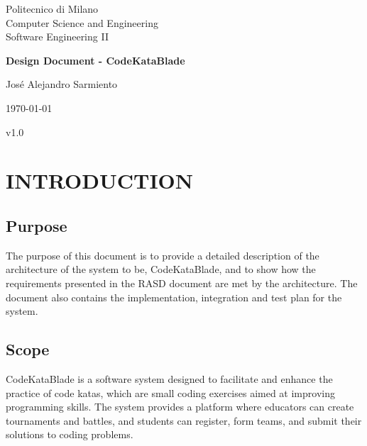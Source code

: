 \documentclass{article}
\begin{document}
\begin{titlepage}
    \begin{center}
        
        Politecnico di Milano\\
      
        Computer Science and Engineering\\
        
        Software Engineering II\\

        \vfill
        
        {\Large \textbf{Design Document - CodeKataBlade}}\\
        
        \vfill

        José Alejandro Sarmiento

        \today

        v1.0
        
    \end{center}
\end{titlepage}
\newpage


\tableofcontents
\newpage

\section{INTRODUCTION}
\subsection{Purpose}

The purpose of this document is to provide a detailed description of the architecture of the system to be, CodeKataBlade, and to show how the requirements presented in the RASD document are met by the architecture. The document also contains the implementation, integration and test plan for the system.

\subsection{Scope}

CodeKataBlade is a software system designed to facilitate and enhance the practice of code katas, which are small coding exercises aimed at improving programming skills. The system provides a platform where educators can create tournaments and battles, and students can register, form teams, and submit their solutions to coding problems.
\end{document}
